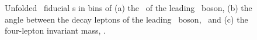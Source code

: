 \begin{figure}[htbp]
\begin{center}
\caption{\label{fig:unfolded-distributions}Unfolded \ZZ\ fiducial \cx s
in bins of (a) the
\pT\ of the leading \Z\ boson, (b) the angle between the decay leptons
of the leading \Z\ boson, \deltaPhiLL\ and (c) the four-lepton invariant mass,
\mZZ. }
\end{center}
\end{figure}

